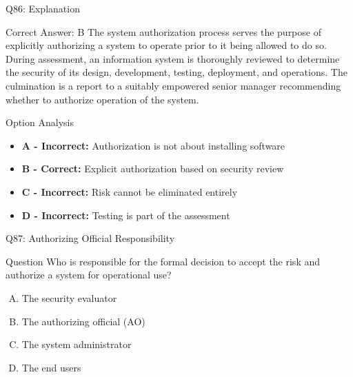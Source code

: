\documentclass{beamer}
\begin{document}
	\begin{frame}{Q86: Explanation}
		\begin{block}{Correct Answer: B}
			The system authorization process serves the purpose of explicitly authorizing a system to operate prior to it being allowed to do so. During assessment, an information system is thoroughly reviewed to determine the security of its design, development, testing, deployment, and operations. The culmination is a report to a suitably empowered senior manager recommending whether to authorize operation of the system.
		\end{block}
		\begin{block}{Option Analysis}
			\begin{itemize}
				\item \textbf{A - Incorrect:} Authorization is not about installing software
				\item \textbf{B - Correct:} Explicit authorization based on security review
				\item \textbf{C - Incorrect:} Risk cannot be eliminated entirely
				\item \textbf{D - Incorrect:} Testing is part of the assessment
			\end{itemize}
		\end{block}
	\end{frame}
	
	\begin{frame}{Q87: Authorizing Official Responsibility}
		\begin{block}{Question}
			Who is responsible for the formal decision to accept the risk and authorize a system for operational use?
		\end{block}
		\begin{enumerate}[(A)]
			\item The security evaluator
			\item The authorizing official (AO)
			\item The system administrator
			\item The end users
		\end{enumerate}
	\end{frame}
	
\end{document}
